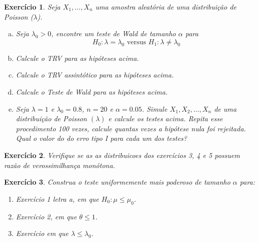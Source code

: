 \documentclass[letter,11pt]{article}
\newtheorem{exer}{Exercício}
\begin{document}
\begin{exer} \rm
Seja $X_1, \ldots, X_n$ uma amostra aleatória de uma distribuição de Poisson ($\lambda$).
  \begin{enumerate}[a)]
    \item Seja $\lambda_0>0$, encontre um teste de Wald de tamanho $\alpha$ para
$$
H_0: \lambda=\lambda_0  \mbox{ versus } H_1: \lambda \neq \lambda_0
$$

    \item Calcule o TRV para as hipóteses acima.

    \item Calcule o TRV assintótico para as hipóteses acima. 
  
    \item Calcule o Teste de Wald para as hipóteses acima.

    \item Seja $\lambda=1$ e $\lambda_0=0.8$, $n=20$ e $\alpha=0.05$. Simule $X_1, X_2, \ldots, X_n$ de uma distribuição de Poisson $(\lambda)$ e calcule os testes acima. Repita esse procedimento 100 vezes, calcule quantas vezes a hipótese nula foi rejeitada. Qual o valor do do erro tipo I para cada um dos testes?
\end{enumerate}
\end{exer}


\begin{exer} \rm
Verifique se as as distribuicoes dos exercícios 3, 4 e 5 possuem razão de verossimilhança monótona. 
\end{exer}


\begin{exer} \rm
Construa o teste uniformemente mais poderoso de tamanho $\alpha$ para:

  \begin{enumerate}
    \item Exercício 1 letra a, em que $H_0: \mu \leq \mu_0$.
    
    \item Exercício 2, em que $\theta \leq 1$.
    
    \item Exercício em que $\lambda \leq \lambda_0$.
  \end{enumerate}
\end{exer}
\end{document}
